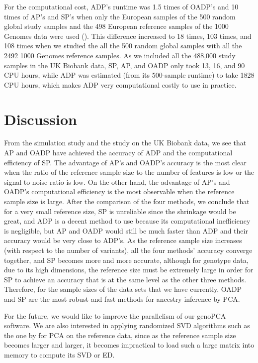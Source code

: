 \documentclass{article}
\begin{document}
For the computational cost,
ADP's runtime was 1.5 times of OADP's and 10 times of AP's and SP's
when only the European samples
of the 500 random global study samples
and the 498 European reference samples of the 1000 Genomes data
were used ().
This difference increased to 18 times, 103 times, and 108 times
when we studied the all the 500 random global samples
with all the 2492 1000 Genomes reference samples.
As we included all the 488,000 study samples in the UK Biobank data,
SP, AP, and OADP only took 13, 16, and 90 CPU hours,
while ADP was estimated (from its 500-sample runtime)
to take 1828 CPU hours,
which makes ADP very computational costly to use in practice.

\section{Discussion}

From the simulation study and the study on the UK Biobank data,
we see that AP and OADP have achieved the accuracy of ADP
and the computational efficiency of SP.
The advantage of AP's and OADP's accuracy
is the most clear
when the ratio of the reference sample size
to the number of features is low
or the signal-to-noise ratio is low.
On the other hand,
the advantage of AP's and OADP's computational efficiency
is the most observable when the reference sample size is large.
After the comparison of the four methods,
we conclude that for a very small reference size,
SP is unreliable since the shrinkage would be great,
and ADP is a decent method to use
because its computational inefficiency is negligible,
but AP and OADP would still be much faster than ADP
and their accuracy would be very close to ADP's.
As the reference sample size increases
(with respect to the number of variants),
all the four methods' accuracy converge together,
and SP becomes more and more accurate,
although for genotype data,
due to its high dimensions,
the reference size must be extremely large
in order for SP to achieve an accuracy
that is at the same level as the other three methods.
Therefore, for the sample sizes
of the data sets that we have currently,
OADP and SP are the most robust and fast methods
for ancestry inference by PCA.

For the future, we would like
to improve the parallelism of our genoPCA software.
We are also interested in applying randomized SVD algorithms
such as the one by \citet{halko2011finding}
for PCA on the reference data,
since as the reference sample size becomes larger and larger,
it becomes impractical to load such a large matrix into memory
to compute its SVD or ED.
\end{document}
